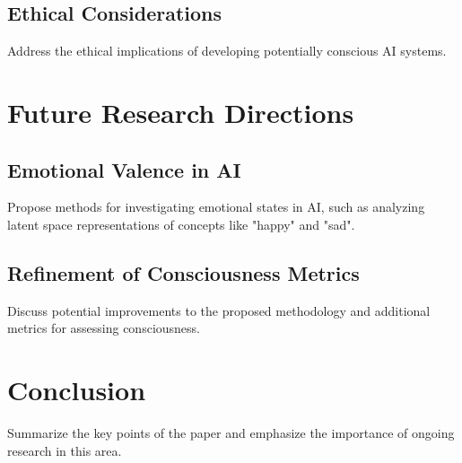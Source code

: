 \documentclass{article}
\begin{document}
\subsection{Ethical Considerations}
Address the ethical implications of developing potentially conscious AI systems.

\section{Future Research Directions}
\subsection{Emotional Valence in AI}
Propose methods for investigating emotional states in AI, such as analyzing latent space representations of concepts like "happy" and "sad".

\subsection{Refinement of Consciousness Metrics}
Discuss potential improvements to the proposed methodology and additional metrics for assessing consciousness.

\section{Conclusion}
Summarize the key points of the paper and emphasize the importance of ongoing research in this area.



\end{document}
